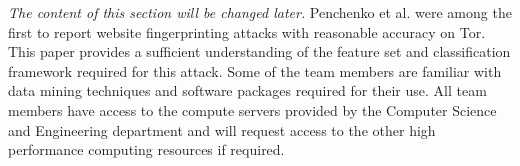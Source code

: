 \emph{The content of this section will be changed later.} Penchenko et al. \cite{panchenko11} were among the first to report website fingerprinting attacks with reasonable accuracy on Tor. This paper provides a sufficient understanding of the feature set and classification framework required for this attack. Some of the team members are familiar with data mining techniques and software packages required for their use. All team members have access to the compute servers provided by the Computer Science and Engineering department and will request access to the other high performance computing resources if required.
